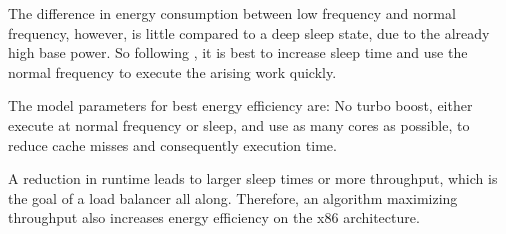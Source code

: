 The difference in energy consumption between low frequency and normal
frequency, however, is little compared to a deep sleep state, due to the
already high base power.
So following \cite{imes_poet_2015}, it is best to increase sleep time and use
the normal frequency to execute the arising work quickly.

The model parameters for best energy efficiency are:
No turbo boost, either execute at normal frequency or sleep, and use as many
cores as possible, to reduce cache misses and consequently execution time.

A reduction in runtime leads to larger sleep times or more throughput, which is
the goal of a load balancer all along.
Therefore, an algorithm maximizing throughput also increases energy efficiency
on the x86 architecture.


